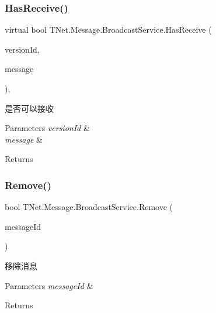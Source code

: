 \subsubsection{\texorpdfstring{Has\+Receive()}{HasReceive()}}
{\footnotesize\ttfamily virtual bool T\+Net.\+Message.\+Broadcast\+Service.\+Has\+Receive (\begin{DoxyParamCaption}\item[{int}]{version\+Id,  }\item[{\mbox{\hyperlink{class_t_net_1_1_message_1_1_notice_message}{Notice\+Message}}}]{message }\end{DoxyParamCaption})\hspace{0.3cm}{\ttfamily [protected]}, {\ttfamily [virtual]}}



是否可以接收 


\begin{DoxyParams}{Parameters}
{\em version\+Id} & \\
\hline
{\em message} & \\
\hline
\end{DoxyParams}
\begin{DoxyReturn}{Returns}

\end{DoxyReturn}
\mbox{\label{class_t_net_1_1_message_1_1_broadcast_service_a8054c86d758370b540e602ca7163ce5e}} 
\subsubsection{\texorpdfstring{Remove()}{Remove()}\hspace{0.1cm}{\footnotesize\ttfamily [1/2]}}
{\footnotesize\ttfamily bool T\+Net.\+Message.\+Broadcast\+Service.\+Remove (\begin{DoxyParamCaption}\item[{Guid}]{message\+Id }\end{DoxyParamCaption})}



移除消息 


\begin{DoxyParams}{Parameters}
{\em message\+Id} & \\
\hline
\end{DoxyParams}
\begin{DoxyReturn}{Returns}

\end{DoxyReturn}
\mbox{\label{class_t_net_1_1_message_1_1_broadcast_service_affa11f7e915ceb928701abd35609694c}} 
